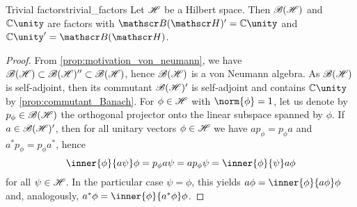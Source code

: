 \begin{proposition}{Trivial factors}{trivial_factors}
    Let \(\mathscr{H}\) be a Hilbert space. Then \(\mathscr{B}(\mathscr{H})\) and \(\mathbb{C} \unity\) are factors with \(\bounded(\hilbert)' = \mathbb{C} \unity\) and \(\mathbb{C} \unity' = \bounded(\hilbert)\).
\end{proposition}
\begin{proof}
    From \cref{prop:motivation_von_neumann}, we have \(\mathscr{B}(\mathscr{H}) \subset \mathscr{B}(\mathscr{H})'' \subset \mathscr{B}(\mathscr{H})\), hence \(\mathscr{B}(\mathscr{H})\) is a von Neumann algebra. As \(\mathscr{B}(\mathscr{H})\) is self-adjoint, then its commutant \(\mathscr{B}(\mathscr{H})'\) is self-adjoint and contains \(\mathbb{C} \unity\) by \cref{prop:commutant_Banach}. For \(\phi \in \mathscr{H}\) with \(\norm{\phi} = 1\), let us denote by \(p_{\phi} \in \mathscr{B}(\mathscr{H})\) the orthogonal projector onto the linear subspace spanned by \(\phi\). If \(a \in \mathscr{B}(\mathscr{H})'\), then for all unitary vectors \(\phi \in \mathscr{H}\) we have \(a p_\phi = p_\phi a\) and \(a^* p_\phi = p_\phi a^*\), hence
    \begin{equation*}
        \inner{\phi}{a \psi}\phi = p_\phi a\psi = ap_\phi \psi  = \inner{\phi}{\psi}a\phi
    \end{equation*}
    for all \(\psi \in \mathscr{H}\). In the particular case \(\psi = \phi\), this yields \(a\phi = \inner{\phi}{a\phi}\phi\) and, analogously, \(a^*\phi = \inner{\phi}{a^*\phi}\phi\).
\end{proof}
